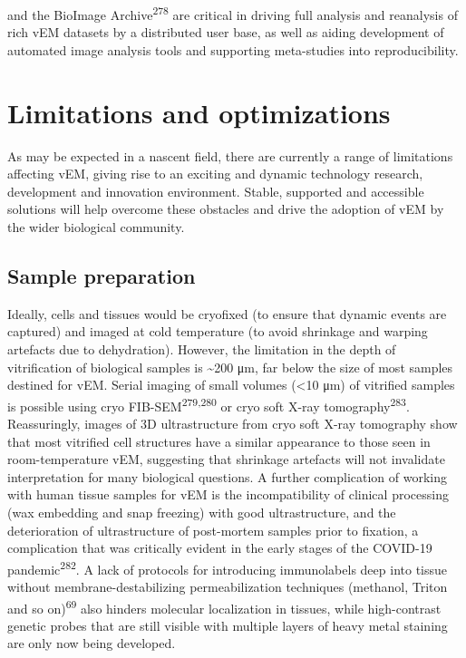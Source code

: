 \documentclass{article}
\begin{document}
and the BioImage Archive\textsuperscript{278} are critical in driving full analysis and reanalysis of rich vEM datasets by a distributed user base, as well as aiding development of automated image analysis tools and supporting meta-studies into reproducibility.

\section*{Limitations and optimizations}

As may be expected in a nascent field, there are currently a range of limitations affecting vEM, giving rise to an exciting and dynamic technology research, development and innovation environment. Stable, supported and accessible solutions will help overcome these obstacles and drive the adoption of vEM by the wider biological community.

\subsection*{Sample preparation}

Ideally, cells and tissues would be cryofixed (to ensure that dynamic events are captured) and imaged at cold temperature (to avoid shrinkage and warping artefacts due to dehydration). However, the limitation in the depth of vitrification of biological samples is \textasciitilde{}200 μm, far below the size of most samples destined for vEM. Serial imaging of small volumes (<10 μm) of vitrified samples is possible using cryo FIB-SEM\textsuperscript{279,280} or cryo soft X-ray tomography\textsuperscript{283}. Reassuringly, images of 3D ultrastructure from cryo soft X-ray tomography show that most vitrified cell structures have a similar appearance to those seen in room-temperature vEM, suggesting that shrinkage artefacts will not invalidate interpretation for many biological questions. A further complication of working with human tissue samples for vEM is the incompatibility of clinical processing (wax embedding and snap freezing) with good ultrastructure, and the deterioration of ultrastructure of post-mortem samples prior to fixation, a complication that was critically evident in the early stages of the COVID-19 pandemic\textsuperscript{282}. A lack of protocols for introducing immunolabels deep into tissue without membrane-destabilizing permeabilization techniques (methanol, Triton and so on)\textsuperscript{69} also hinders molecular localization in tissues, while high-contrast genetic probes that are still visible with multiple layers of heavy metal staining are only now being developed.
\end{document}
